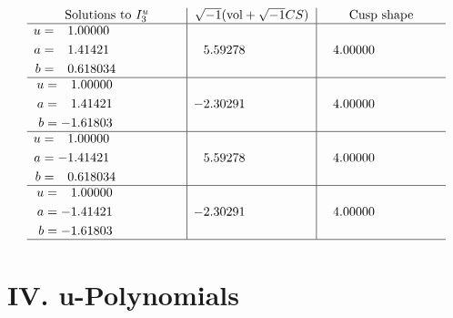 \documentclass[1p]{elsarticle_modified}
\theoremstyle{definition}
\newcommand{\I}{\sqrt{-1}}
\begin{document}
$$\begin{array}{c|c|c}  
\text{Solutions to }I^u_{3}& \I (\text{vol} + \sqrt{-1}CS) & \text{Cusp shape}\\
 \hline 
\begin{aligned}
u &= \phantom{-}1.00000\phantom{ +0.000000I} \\
a &= \phantom{-}1.41421\phantom{ +0.000000I} \\
b &= \phantom{-}0.618034\phantom{ +0.000000I}\end{aligned}
 & \phantom{-}5.59278\phantom{ +0.000000I} & \phantom{-}4.00000\phantom{ +0.000000I} \\ \hline\begin{aligned}
u &= \phantom{-}1.00000\phantom{ +0.000000I} \\
a &= \phantom{-}1.41421\phantom{ +0.000000I} \\
b &= -1.61803\phantom{ +0.000000I}\end{aligned}
 & -2.30291\phantom{ +0.000000I} & \phantom{-}4.00000\phantom{ +0.000000I} \\ \hline\begin{aligned}
u &= \phantom{-}1.00000\phantom{ +0.000000I} \\
a &= -1.41421\phantom{ +0.000000I} \\
b &= \phantom{-}0.618034\phantom{ +0.000000I}\end{aligned}
 & \phantom{-}5.59278\phantom{ +0.000000I} & \phantom{-}4.00000\phantom{ +0.000000I} \\ \hline\begin{aligned}
u &= \phantom{-}1.00000\phantom{ +0.000000I} \\
a &= -1.41421\phantom{ +0.000000I} \\
b &= -1.61803\phantom{ +0.000000I}\end{aligned}
 & -2.30291\phantom{ +0.000000I} & \phantom{-}4.00000\phantom{ +0.000000I}\\
 \hline 
 \end{array}$$\newpage
\newpage\renewcommand{\arraystretch}{1}
\centering \section*{ IV. u-Polynomials}
\end{document}
